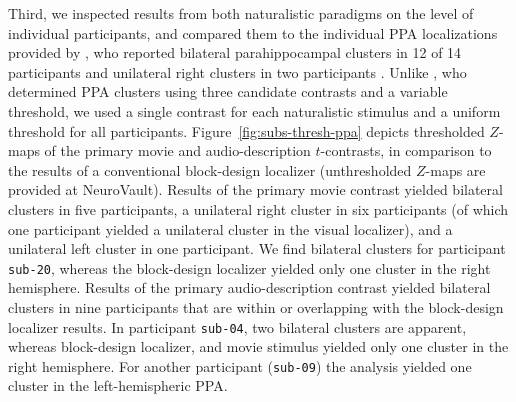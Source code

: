 \documentclass[english]{article}
\begin{document}

Third, we inspected results from both naturalistic paradigms on the level of
individual participants, and compared them to the individual PPA localizations
provided by \cite{sengupta2016extension}, who reported
bilateral parahippocampal clusters in 12 of 14 participants and unilateral right
clusters in two participants \citep[Tab.~3 in][]{sengupta2016extension}.
Unlike \cite{sengupta2016extension}, who determined PPA clusters using three
candidate contrasts and a variable threshold, we used a single contrast for each
naturalistic stimulus and a uniform threshold for all participants.
Figure~\ref{fig:subs-thresh-ppa} depicts thresholded $Z$-maps of the primary
movie and audio-description $t$-contrasts, in comparison to the results of a
conventional block-design localizer (unthresholded $Z$-maps are provided at
NeuroVault).
Results of the primary movie contrast yielded bilateral clusters in five
participants, a unilateral right cluster in six participants (of which one
participant yielded a unilateral cluster in the visual localizer), and a
unilateral left cluster in one participant.
We find bilateral clusters for participant \texttt{sub-20}, whereas the
block-design localizer yielded only one cluster in the right hemisphere.
Results of the primary audio-description contrast yielded bilateral clusters in
nine participants that are within or overlapping with the block-design localizer
results.
In participant \texttt{sub-04}, two bilateral clusters are apparent, whereas
block-design localizer, and movie stimulus yielded only one cluster in the right
hemisphere.
For another participant (\texttt{sub-09}) the analysis yielded one cluster in
the left-hemispheric PPA.
\end{document}
